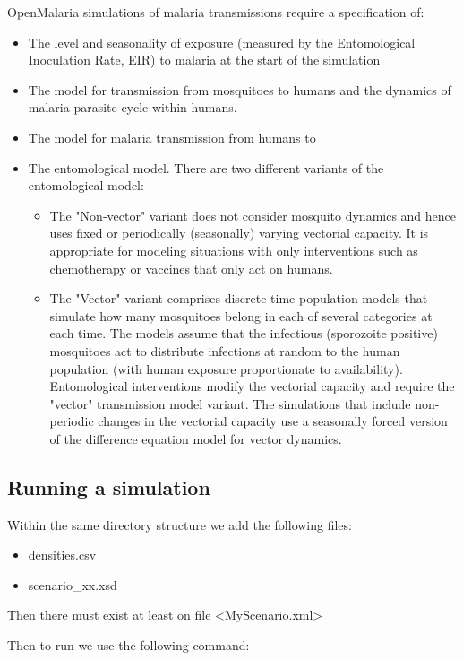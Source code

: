 \documentclass[]{scrartcl}
\begin{document}
OpenMalaria simulations of malaria transmissions require a specification of:
\begin{itemize}
	\item The level and seasonality of exposure (measured by the Entomological Inoculation Rate, EIR) to malaria at the start of the simulation
	\item The model for transmission from mosquitoes to humans and the dynamics of malaria parasite cycle within humans.
	\item The model for malaria transmission from humans to 
	\item The entomological model. There are two different variants of the entomological model:
	\begin{itemize}
    \item The "Non-vector" variant does not consider mosquito dynamics and hence uses fixed or periodically (seasonally) varying vectorial capacity. It is appropriate for modeling situations with only interventions such as chemotherapy or vaccines that only act on humans.
	\item The "Vector" variant comprises discrete-time population models that simulate how many mosquitoes belong in each of several categories at each time. The models assume that the infectious (sporozoite positive) mosquitoes act to distribute infections at random to the human population (with human exposure proportionate to availability). Entomological interventions modify the vectorial capacity and require the "vector" transmission model variant. The simulations that include non-periodic changes in the vectorial capacity use a seasonally forced version of the difference equation model for vector dynamics.
\end{itemize}
\end{itemize}



\subsection{Running a simulation}
Within the same directory structure we add the following files: 

\begin{itemize}
\item densities.csv
\item scenario\_xx.xsd
\end{itemize}
Then there must exist at least on file <MyScenario.xml>

Then to run we use the following command:
\end{document}
